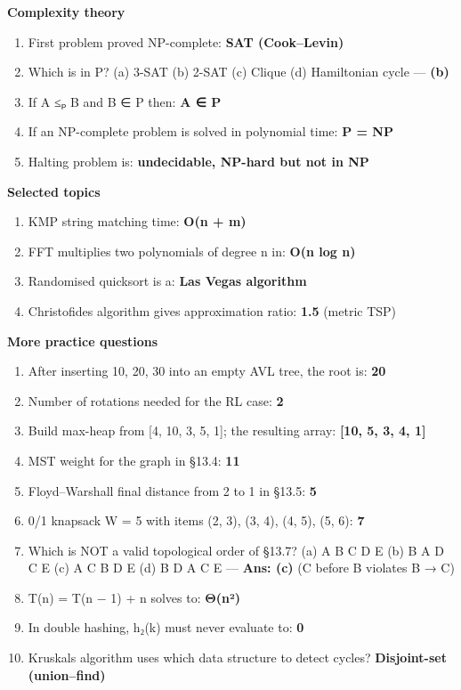 \textbf{Complexity theory}

\begin{enumerate}
\def\labelenumi{\arabic{enumi}.}
\setcounter{enumi}{47}
\tightlist
\item
  First problem proved NP-complete: \textbf{SAT (Cook--Levin)}
\item
  Which is in P? (a) 3-SAT (b) 2-SAT (c) Clique (d) Hamiltonian cycle --- \textbf{(b)}
\item
  If A ≤ₚ B and B ∈ P then: \textbf{A ∈ P}
\item
  If an NP-complete problem is solved in polynomial time: \textbf{P = NP}
\item
  Halting problem is: \textbf{undecidable, NP-hard but not in NP}
\end{enumerate}

\textbf{Selected topics}

\begin{enumerate}
\def\labelenumi{\arabic{enumi}.}
\setcounter{enumi}{52}
\tightlist
\item
  KMP string matching time: \textbf{O(n + m)}
\item
  FFT multiplies two polynomials of degree n in: \textbf{O(n log n)}
\item
  Randomised quicksort is a: \textbf{Las Vegas algorithm}
\item
  Christofides algorithm gives approximation ratio: \textbf{1.5} (metric TSP)
\end{enumerate}

\textbf{More practice questions}

\begin{enumerate}
\def\labelenumi{\arabic{enumi}.}
\setcounter{enumi}{56}
\tightlist
\item
  After inserting 10, 20, 30 into an empty AVL tree, the root is: \textbf{20}
\item
  Number of rotations needed for the RL case: \textbf{2}
\item
  Build max-heap from {[}4, 10, 3, 5, 1{]}; the resulting array: \textbf{{[}10, 5, 3, 4, 1{]}}
\item
  MST weight for the graph in §13.4: \textbf{11}
\item
  Floyd--Warshall final distance from 2 to 1 in §13.5: \textbf{5}
\item
  0/1 knapsack W = 5 with items (2, 3), (3, 4), (4, 5), (5, 6): \textbf{7}
\item
  Which is NOT a valid topological order of §13.7? (a) A B C D E (b) B A D C E (c) A C B D E (d) B D A C E --- \textbf{Ans: (c)} (C before B violates B → C)
\item
  T(n) = T(n − 1) + n solves to: \textbf{Θ(n²)}
\item
  In double hashing, h₂(k) must never evaluate to: \textbf{0}
\item
  Kruskal\textquotesingle s algorithm uses which data structure to detect cycles? \textbf{Disjoint-set (union--find)}
\end{enumerate}

